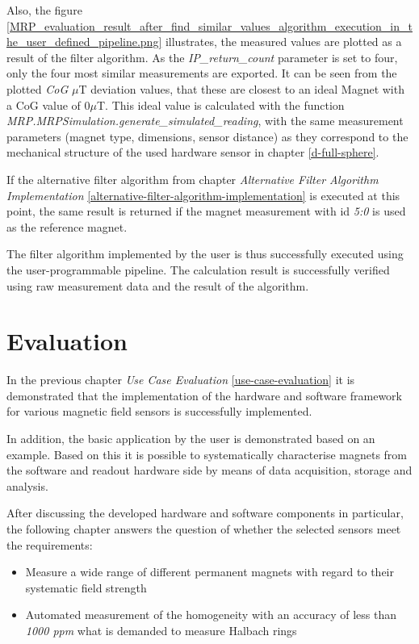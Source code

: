 Also, the figure
\ref{MRP_evaluation_result_after_find_similar_values_algorithm_execution_in_the_user_defined_pipeline.png}
illustrates, the measured values are plotted as a result of the filter
algorithm. As the \emph{IP\_return\_count} parameter is set to four,
only the four most similar measurements are exported. It can be seen
from the plotted \emph{CoG} \(\mu\)T deviation values, that these are
closest to an ideal Magnet with a CoG value of 0\(\mu\)T. This ideal
value is calculated with the function
\emph{MRP.MRPSimulation.generate\_simulated\_reading}, with the same
measurement parameters (magnet type, dimensions, sensor distance) as
they correspond to the mechanical structure of the used hardware sensor
in chapter \ref{d-full-sphere}.

If the alternative filter algorithm from chapter \emph{Alternative
Filter Algorithm Implementation}
\ref{alternative-filter-algorithm-implementation} is executed at this
point, the same result is returned if the magnet measurement with
\gls{id} \emph{5:0} is used as the reference magnet.

The filter algorithm implemented by the user is thus successfully
executed using the user-programmable pipeline. The calculation result is
successfully verified using raw measurement data and the result of the
algorithm.

\hypertarget{evaluation}{%
\chapter{Evaluation}\label{evaluation}}

In the previous chapter \emph{Use Case Evaluation}
\ref{use-case-evaluation} it is demonstrated that the implementation of
the hardware and software framework for various magnetic field sensors
is successfully implemented.

In addition, the basic application by the user is demonstrated based on
an example. Based on this it is possible to systematically characterise
magnets from the software and readout hardware side by means of data
acquisition, storage and analysis.

After discussing the developed hardware and software components in
particular, the following chapter answers the question of whether the
selected sensors meet the requirements:

\begin{itemize}
\tightlist
\item
  Measure a wide range of different permanent magnets with regard to
  their systematic field strength
\item
  Automated measurement of the homogeneity with an accuracy of less than
  \emph{1000 \gls{ppm}} what is demanded to measure Halbach rings
\end{itemize}

